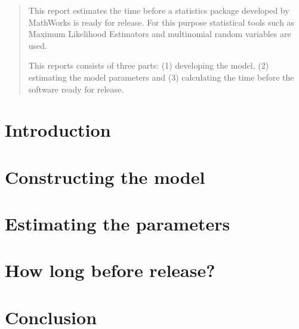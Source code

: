 \documentclass{article}
\begin{document}
\maketitle
\begin{abstract}
This report estimates the time before a statistics package developed by MathWorks is ready for release. For this purpose statistical tools such as Maximum Likelihood Estimators and multinomial random variables are used.

This reports consists of three parts: (1) developing the model,  (2) estimating the model parameters and (3) calculating the time before the software ready for release. 
\end{abstract}
\newpage
\tableofcontents

\section{Introduction}

\section{Constructing the model}\label{sec:2}

\section{Estimating the parameters}\label{sec:estimators}

\section{How long before release?}\label{sec:results}

\section{Conclusion}


\newpage
\appendix

\end{document}
